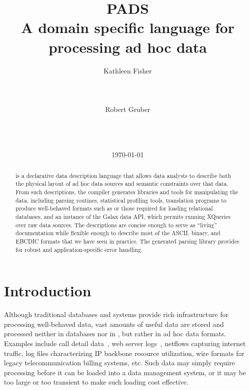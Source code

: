 \documentclass{sig-alternate}
\begin{document}
\title{PADS\\ A domain specific language for processing ad hoc data}

\author{
\alignauthor Kathleen Fisher\\
       \\
       \\
       \\
\alignauthor Robert Gruber\\
       \\
       \\
       \\
}

\date{\today}
\maketitle
\begin{abstract}
\pads{} is a declarative data description language that allows data
analysts to describe both the physical layout of ad hoc data sources
and semantic constraints over that data.  From such descriptions, the
\pads{} compiler generates libraries and tools for manipulating the
data, including parsing routines, statistical profiling tools,
translation programs to produce well-behaved
formats such as \xml{} or those required for loading relational
databases, and an instance of the Galax data API, which permits
running XQueries over raw \pads{} data sources.
The descriptions are concise enough to serve as ``living'' documentation
while flexible enough to describe most of the ASCII, binary, and
EBCDIC formats that we have seen in practice.  The generated parsing
library provides for robust and application-specific error handling.
\end{abstract}

\section{Introduction}


Although traditional databases and \xml{} systems provide rich
infrastructure for processing well-behaved data, vast amounts of
useful data are stored and processed neither in databases nor in
\xml{}, but rather in ad hoc data formats. 
Examples include call detail data~\cite{kdd00}, 
web server logs~\cite{wpp}, 
netflows capturing internet traffic\cite{netflow}, 
log files characterizing IP backbone resource utilization,
wire formats for legacy telecommunication billing systems, 
etc{}. 
Such data may simply require processing before it can be loaded into a
data management system, or it may be too large or too transient to
make such loading cost effective.
\end{document}
